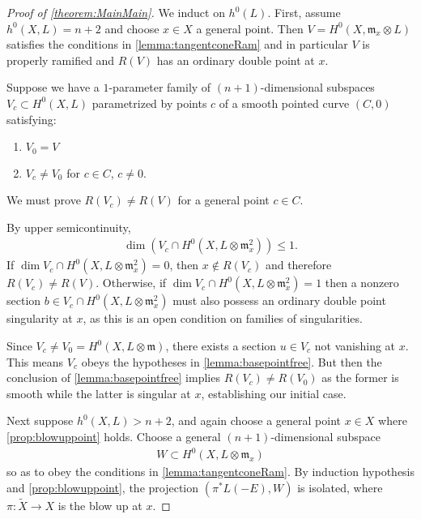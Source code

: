 \documentclass[11pt,reqno]{amsart}
\theoremstyle{plain}
\theoremstyle{definition}
\theoremstyle{remark}
\numberwithin{equation}{section}
\DeclareMathOperator{\dm}{dim}
\renewcommand{\to}{{\longrightarrow}}
\numberwithin{equation}{section}
\begin{document}
\begin{proof}[Proof of \autoref{theorem:MainMain}]
  We induct on $h^{0}(L)$.  First, assume $h^{0}(X,L) = n+2$ and choose $x \in X$ a general point. Then $V  =  H^{0}(X,{\mathfrak m}_{x}\otimes L)$ satisfies the conditions in \autoref{lemma:tangentconeRam} and in particular $V$ is properly ramified and $R(V)$ has an ordinary double point at $x$.  

  Suppose we have a $1$-parameter family of $(n+1)$-dimensional subspaces $V_{c} \subset H^{0}(X,L)$ parametrized by points $c$ of a smooth pointed curve $(C,0)$ satisfying:
  \begin{enumerate}
  \item $V_{0} = V$ 
  \item $V_{c} \neq V_{0}$ for $c \in C$, $c \neq 0$.
  \end{enumerate}
  We must prove $R(V_{c}) \neq R(V)$ for a general point $c \in C$. 


  By upper semicontinuity, 
  \begin{align*}
    \dm \left(V_{c} \cap H^{0}(X,L \otimes \mathfrak{m}^{2}_{x})\right) \leq 1.
  \end{align*}
If $\dm V_{c} \cap H^{0}(X,L \otimes \mathfrak{m}^{2}_{x}) = 0$, then $x \notin R(V_{c})$ and therefore $R(V_{c}) \neq R(V)$.  Otherwise, if $\dm V_{c} \cap H^{0}(X,L \otimes \mathfrak{m}^{2}_{x}) = 1$ then a nonzero section $b \in V_{c} \cap H^{0}(X,L \otimes \mathfrak{m}^{2}_{x})$ must also possess an ordinary double point singularity at $x$, as this is an open condition on families of singularities.

Since $V_{c} \neq V_{0} = H^{0}(X,L\otimes\mathfrak{m})$, there exists a section $u \in V_{c}$ not vanishing at $x$.  This means $V_{c}$ obeys the hypotheses in \autoref{lemma:basepointfree}. But then the conclusion of \autoref{lemma:basepointfree} implies $R(V_{c}) \neq R(V_{0})$ as the former is smooth while the latter is singular at $x$, establishing our initial case.


Next suppose $h^{0}(X,L) > n+2$, and again choose a general point $x \in X$ where \autoref{prop:blowuppoint} holds. Choose a general $(n+1)$-dimensional subspace 
\begin{align*}
  W \subset  H^{0}(X, L \otimes {\mathfrak m}_{x})
\end{align*}
so as to obey the conditions in \autoref{lemma:tangentconeRam}. By induction hypothesis and \autoref{prop:blowuppoint}, the projection $(\pi^{*}L(-E),W)$ is isolated, where $\pi: \widetilde{X} \to X$ is the blow up at $x$.  


\end{proof}
\end{document}
